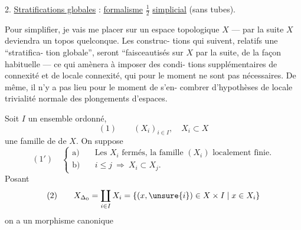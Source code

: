 2. \uline{Stratifications globales} : \uline{formalisme} $\frac12$ \uline{simplicial}
(sans tubes).

Pour simplifier, je vais me placer sur un
espace topologique $X$ --- par la suite $X$
deviendra un topos quelconque. Les construc-
tions qui suivent, relatifs  une ``stratifica-
tion globale'', seront ``faisceautisés sur $X$
par la suite, de la façon habituelle ---
ce qui amènera  à imposer des condi-
tions supplémentaires de connexité et
de locale connexité, qui pour le moment
ne sont pas nécessaires. De même, il n'y
a pas lieu pour le moment de s'en-
combrer d'hypothèses de locale trivialité
normale des plongements d'espaces.

Soit $I$ un ensemble ordonné, 
\[
(1)\qquad (X_i)_{i\in I},\quad X_i\subset X
\]
une famille de  de $X$. On suppose
\[
(1')\quad\left\{\begin{aligned}
\text{a)}\quad&\text{Les }X_i\text{ fermés, la famille }(X_i)\text{ localement finie.}\\
\text{b)}\quad&i\leq j\ \Longrightarrow\ X_i\subset X_j.
\end{aligned}\right.
\]
Posant
\[
(2)\qquad X_{\Delta_0}=\coprod_{i\in I}X_i
=\{(x,\unsure{i})\in X\times I\mid x\in X_i\}
\]
on a un morphisme canonique
